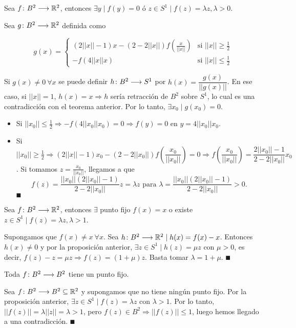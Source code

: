 \documentclass[GTS.tex]{subfiles}
\begin{document}
\begin{prop} Sea $f\colon{B^2}\longrightarrow{\mathbb{R}^2}$, entonces $\exists y\mid f(y)=0$ ó $z\in S^1\mid f(z)=\lambda z, \lambda>0$.
\end{prop}
\begin{dem}
Sea $g\colon{B^2}\longrightarrow{\mathbb{R}^2}$ definida como

\[
g(x)=\begin{cases}
(2||x||-1)x-(2-2||x||)f\left(\frac{x}{||x||}\right) & \text{si  } ||x||\geq\frac{1}{2}\\
-f(4||x|| x) & \text{si  } ||x||\leq\frac{1}{2}
\end{cases}
\]

Si $g(x)\neq 0\ \forall x$ se puede definir $h\colon{B^2}\longrightarrow{S^1}$ por $h(x)=\dfrac{g(x)}{||g(x)||}$. En ese caso, si $||x||=1$, $h(x)=x\Rightarrow h$ sería retracción de $B^2$ sobre $S^1$, lo cual es una contradicción con el teorema anterior. Por lo tanto, $\exists x_0\mid g(x_0)=0$.
\begin{itemize}
\item Si $||x_0||\leq\frac{1}{2}\Rightarrow -f(4||x_0||x_0)=0\Rightarrow f(y)=0$ en $y=4||x_0||x_0$.
\item Si $||x_0||\geq\frac{1}{2}\Rightarrow (2||x||-1)x_0-(2-2||x_0||)f\left(\dfrac{x_0}{||x_0||}\right)=0\Rightarrow f\left(\dfrac{x_0}{||x_0||}\right)=\dfrac{2||x_0||-1}{2-2||x_0||}x_0$. Si tomamos $z=\frac{x_0}{||x_0||}$, llegamos a que
\[
f(z)=\dfrac{||x_0||(2||x_0||-1)}{2-2||x_0||}z=\lambda z \mbox{    para } \lambda=\dfrac{||x_0||(2||x_0||-1)}{2-2||x_0||}>0.
\]
 $\QED$
\end{itemize}
\end{dem}

\vspace{0.2cm}

\begin{prop} Sea $f\colon{B^2}\longrightarrow{\mathbb{R}^2}$, entonces $\exists$ punto fijo $f(x)=x$ o existe $z\in S^1 \mid f(z)=\lambda z, \lambda>1$.
\end{prop}
\begin{dem}
Supongamos que $f(x)\neq x\ \forall x$. Sea $h\colon{B^2}\longrightarrow{\mathbb{R}^2}\mid h(x)=f(x)-x$. Entonces $h(x)\neq 0$ y por la proposición anterior, $\exists z\in S^1\mid h(z)=\mu z$ con $\mu>0$, es decir, $f(z)-z=\mu z\Rightarrow f(z)=(1+\mu)z$. Basta tomar $\lambda=1+\mu$. $\QED$
\end{dem}

\vspace{0.2cm}

\begin{teorema} Toda $f\colon{B^2}\longrightarrow{B^2}$ tiene un punto fijo.
\end{teorema}
\begin{dem}
Sea $f\colon{B^2}\longrightarrow{B^2\subseteq\mathbb{R}^2}$ y supongamos que no tiene ningún punto fijo. Por la proposición anterior, $\exists z\in S^1\mid f(z)=\lambda z$ con $\lambda>1$. Por lo tanto, $||f(z)||=\lambda||z||=\lambda>1$, pero $f(z)\in B^2\Rightarrow||f(z)||\leq 1$, luego hemos llegado a una contradicción. $\QED$
\end{dem}
\end{document}

